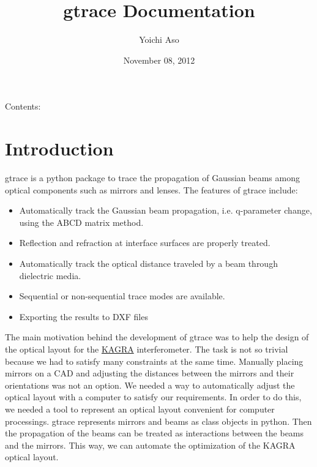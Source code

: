 \documentclass[letterpaper,10pt,english]{sphinxmanual}
\title{gtrace Documentation}
\date{November 08, 2012}
\author{Yoichi Aso}
\begin{document}
\maketitle
\tableofcontents
{}\label{index::doc}


Contents:


\chapter{Introduction}
\label{intro:introduction}\label{intro:gtrace-documentation}\label{intro::doc}
gtrace is a python package to trace the propagation of Gaussian beams among optical components such as mirrors and lenses. The features of gtrace include:
\begin{itemize}
\item {} 
Automatically track the Gaussian beam propagation, i.e. q-parameter change, using the ABCD matrix method.

\item {} 
Reflection and refraction at interface surfaces are properly treated.

\item {} 
Automatically track the optical distance traveled by a beam through dielectric media.

\item {} 
Sequential or non-sequential trace modes are available.

\item {} 
Exporting the results to DXF files

\end{itemize}

The main motivation behind the development of gtrace was to help the design of the optical layout for the \href{http://gwcenter.icrr.u-tokyo.ac.jp/en/}{KAGRA} interferometer. The task is not so trivial because we had to satisfy many constraints at the same time. Manually placing mirrors on a CAD and adjusting the distances between the mirrors and their orientations was not an option. We needed a way to automatically adjust the optical layout with a computer to satisfy our requirements. In order to do this, we needed a tool to represent an optical layout convenient for computer processings. gtrace represents mirrors and beams as class objects in python. Then the propagation of the beams can be treated as interactions between the beams and the mirrors. This way, we can automate the optimization of the KAGRA optical layout.
\end{document}
